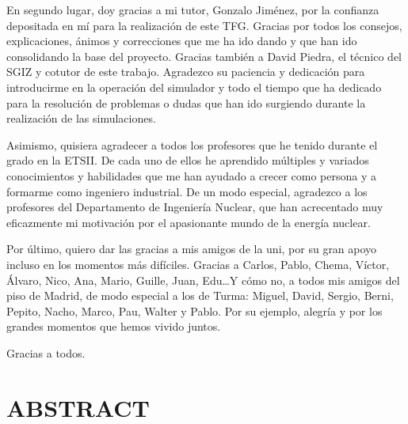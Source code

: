\documentclass[a4paper, 11pt, english, twoside]{article}
\begin{document}
En segundo lugar, doy gracias a mi tutor, Gonzalo Jiménez, por la confianza depositada en mí para la realización de este TFG. Gracias por todos los consejos, explicaciones, ánimos y correcciones que me ha ido dando y que han ido consolidando la base del proyecto.
Gracias también a David Piedra, el técnico del SGIZ y cotutor de este trabajo. Agradezco su paciencia y dedicación para introducirme en la operación del simulador y todo el tiempo que ha dedicado para la resolución de problemas o dudas que han ido surgiendo durante la realización de las simulaciones.

Asimismo, quisiera agradecer a todos los profesores que he tenido durante el grado en la ETSII. De cada uno de ellos he aprendido múltiples y variados conocimientos y habilidades que me han ayudado a crecer como persona y a formarme como ingeniero industrial. De un modo especial, agradezco a los profesores del Departamento de Ingeniería Nuclear, que han acrecentado muy eficazmente mi motivación por el apasionante mundo de la energía nuclear.

Por último, quiero dar las gracias a mis amigos de la uni, por su gran apoyo incluso en los momentos más difíciles. Gracias a Carlos, Pablo, Chema, Víctor, Álvaro, Nico, Ana, Mario, Guille, Juan, Edu\dots Y cómo no, a todos mis amigos del piso de Madrid, de modo especial a los de Turma: Miguel, David, Sergio, Berni, Pepito, Nacho, Marco, Pau, Walter y Pablo. Por su ejemplo, alegría y por los grandes momentos que hemos vivido juntos.

Gracias a todos.

\afterpage{\blankpage} %

\newpage
\section*{ABSTRACT} %
{} %
\end{document}

